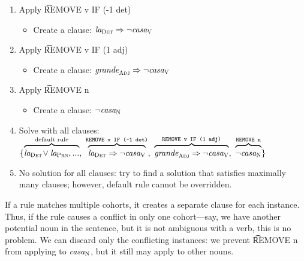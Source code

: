 \begin{enumerate}
\item Apply \t{REMOVE v IF (-1 det)}
 \begin{itemize}
    \item Create a clause: $\text{\em la}_{\text{\sc Det}} \Rightarrow \neg \text{\em casa}_{\text{\sc V}}$
 \end{itemize}
\item Apply \t{REMOVE v IF (1 adj)} 
 \begin{itemize}
    \item Create a clause: $\text{\em grande}_{\text{\sc Adj}} \Rightarrow \neg \text{\em casa}_{\text{\sc V}}$
 \end{itemize}
\item Apply \t{REMOVE n}
 \begin{itemize}
    \item Create a clause: $\neg \text{\em casa}_{\text{\sc N}}$
 \end{itemize}

\item Solve with all clauses:
  $\{ \ob{\laDet \! \vee \laPrn, ...}^{\text{default rule}}, \ 
      \ob{\laDet \Rightarrow \neg \casaV}^{\t{REMOVE v IF (-1 det)}}, \ 
      \ob{\grandeAdj \Rightarrow \neg \casaV}^{\t{REMOVE v IF (1 adj)}}, \ 
      \ob{\neg \casaN}^{\t{REMOVE n}} \}$
\item No solution for all clauses: try to find a solution that satisfies maximally many clauses; however, default rule cannot be overridden.
\end{enumerate}

If a rule matches multiple cohorts, it creates a separate clause for each instance.
Thus, if the rule causes a conflict in only one cohort---say, we have another potential noun in the sentence, but it is not ambiguous with a verb, this is no problem. We can discard only the conflicting instances: we prevent \t{REMOVE n} from applying to $\text{\em casa}_{\text{\sc N}}$, but it still may apply to other nouns.


